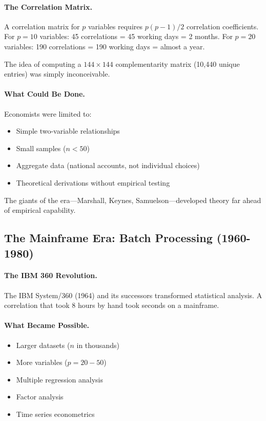 \documentclass[12pt,a4paper]{article}
\begin{document}
\paragraph{The Correlation Matrix.}
A correlation matrix for $p$ variables requires $p(p-1)/2$ correlation coefficients.
For $p = 10$ variables: 45 correlations = 45 working days = 2 months.
For $p = 20$ variables: 190 correlations = 190 working days = almost a year.

The idea of computing a $144 \times 144$ complementarity matrix
(10,440 unique entries) was simply inconceivable.

\paragraph{What Could Be Done.}
Economists were limited to:
\begin{itemize}
  \item Simple two-variable relationships
  \item Small samples ($n < 50$)
  \item Aggregate data (national accounts, not individual choices)
  \item Theoretical derivations without empirical testing
\end{itemize}

The giants of the era---Marshall, Keynes, Samuelson---developed theory
far ahead of empirical capability.

\subsection{The Mainframe Era: Batch Processing (1960-1980)}

\paragraph{The IBM 360 Revolution.}
The IBM System/360 (1964) and its successors transformed statistical analysis.
A correlation that took 8 hours by hand took seconds on a mainframe.

\paragraph{What Became Possible.}
\begin{itemize}
  \item Larger datasets ($n$ in thousands)
  \item More variables ($p = 20-50$)
  \item Multiple regression analysis
  \item Factor analysis
  \item Time series econometrics
\end{itemize}
\end{document}
